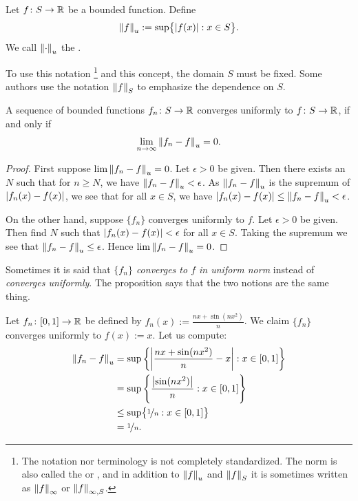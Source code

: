 \begin{defn} \label{def:unifnorm}
Let $f \colon S \to {\mathbb{R}}$ be a bounded function.  Define
\begin{equation*}
\left\lVert {f} \right\rVert_u :=
\sup \bigl\{ \left\lvert {f(x)} \right\rvert : x \in S \bigr\} .
\end{equation*}
We call $\left\lVert {\cdot} \right\rVert_u$ the \emph{}.
\end{defn}

To use this notation%
\footnote{The notation nor terminology is not completely standardized.  The norm is
also called the
\emph{} or
\emph{}, and in addition
to $\left\lVert {f} \right\rVert_u$ and $\left\lVert {f} \right\rVert_S$ it is sometimes written
as $\left\lVert {f} \right\rVert_{\infty}$ or $\left\lVert {f} \right\rVert_{\infty,S}$.}
and this concept, the domain $S$ must be fixed.  Some authors
use
the notation
$\left\lVert {f} \right\rVert_S$ to emphasize the dependence on $S$.

\begin{prop}
A sequence of bounded functions $f_n \colon S \to {\mathbb{R}}$ converges
uniformly to $f \colon S \to {\mathbb{R}}$, if and only if
\begin{equation*}
\lim_{n\to\infty} \left\lVert {f_n - f} \right\rVert_u = 0 .
\end{equation*}
\end{prop}

\begin{proof}
First suppose 
$\lim \left\lVert {f_n - f} \right\rVert_u = 0$.  Let $\epsilon > 0$ be
given.  Then there exists an $N$ such that
for $n \geq N$, we have $\left\lVert {f_n - f} \right\rVert_u < \epsilon$.  As $\left\lVert {f_n-f} \right\rVert_u$
is the supremum of $\left\lvert {f_n(x)-f(x)} \right\rvert$, we see that for all $x \in S$,
we have $\left\lvert {f_n(x)-f(x)} \right\rvert \leq \left\lVert {f_n - f} \right\rVert_u < \epsilon$.

On the other hand, suppose $\{ f_n \}$ converges uniformly to $f$.
Let $\epsilon > 0$ be given.  Then find $N$ such that 
$\left\lvert {f_n(x)-f(x)} \right\rvert < \epsilon$ for all $x \in S$.
Taking the supremum we see that
$\left\lVert {f_n - f} \right\rVert_u \leq \epsilon$.  Hence $\lim \left\lVert {f_n-f} \right\rVert_u = 0$.
\end{proof}

Sometimes it is said that \emph{$\{ f_n \}$ converges to $f$ in uniform norm}
instead of \emph{converges uniformly}.  The proposition
says that the two notions are the same thing.

\begin{example}
Let $f_n \colon [0,1] \to {\mathbb{R}}$ be defined by $f_n(x) := \frac{nx+ \sin(nx^2)}{n}$.
We claim $\{ f_n \}$ converges uniformly to $f(x) := x$.  Let us compute:
\begin{equation*}
\begin{split}
\left\lVert {f_n-f} \right\rVert_u
& =
\sup \left\{ \left\lvert {\frac{nx+ \sin(nx^2)}{n} - x} \right\rvert : x \in [0,1] \right\}
\\
& =
\sup \left\{ \frac{\left\lvert {\sin(nx^2)} \right\rvert}{n} : x \in [0,1] \right\}
\\
& \leq
\sup \bigl\{ \nicefrac{1}{n} : x \in [0,1] \bigr\}
\\
& = \nicefrac{1}{n}.
\end{split}
\end{equation*}
\end{example}

